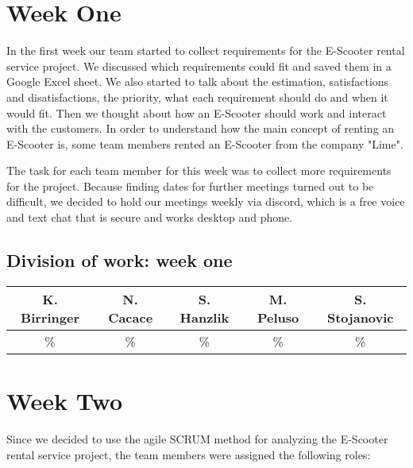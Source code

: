 \documentclass[a4paper, 12pt]{article}
\begin{document}

\section{Week One}
In the first week our team started to collect requirements for the E-Scooter rental service project. We discussed which requirements could fit and saved them in a Google Excel sheet. We also started to talk about the estimation, satisfactions and disatisfactions, the priority, what each requirement should do and when it would fit.
Then we thought about how an E-Scooter should work and interact with the customers.
In order to understand how the main concept of renting an E-Scooter is, some team members rented an E-Scooter from the company "Lime".

The task for each team member for this week was to collect more requirements for the project.
Because finding dates for further meetings turned out to be difficult, we decided to hold our meetings weekly via discord, which is a free voice and text chat that is secure and works desktop and phone. \cite{discord}

\subsection{Division of work: week one}
\begin{table}[h]
\centering
\setlength{\tabcolsep}{12pt}
\begin{tabular}{|c|c|c|c|c|}
\hline
K. Birringer & N. Cacace & S. Hanzlik & M. Peluso & S. Stojanovic\\
\hline
\% & \% & \% & \% & \% \\ 
\hline
\end{tabular}
\end{table}

\section{Week Two}
Since we decided to use the agile SCRUM method for analyzing the E-Scooter rental service project, the team members were assigned the following roles:
\end{document}
